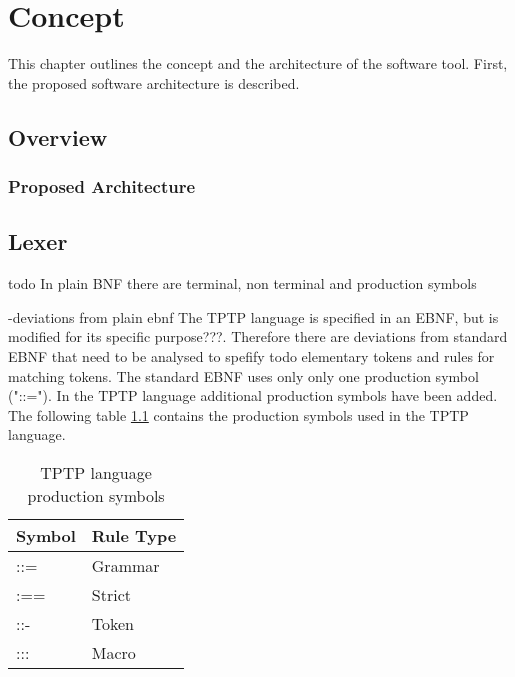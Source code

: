 
\chapter{Concept}\label{cha:Concept}
This chapter outlines the concept and the architecture of the software tool. First, the proposed software architecture is described.



\section{Overview}\label{sec:ConceptOverview}

\subsection{Proposed Architecture}\label{sec:ConceptProposedArchitecture}

\section{Lexer}

todo In plain \ac{BNF} there are terminal, non terminal and production symbols

-deviations from plain ebnf
The \ac{TPTP} language is specified in an \ac{EBNF}, but is modified for its specific purpose???.
Therefore there are deviations from standard \ac{EBNF} that need to be analysed to spefify todo elementary tokens and rules for matching tokens.
The standard \ac{EBNF} uses only only one production symbol ("::="). In the \ac{TPTP} language
additional production symbols have been added. The following table \ref{tbl:ConceptTPTPProductionSymbols} contains the production symbols used in the \ac{TPTP} language.

\begin{table}[H]
\centering
\renewcommand{\arraystretch}{1}
\caption{\ac{TPTP} language production symbols \cite{VS06}}
\begin{tabular}{ll}
\textbf{Symbol} & \textbf{Rule Type}\\\hline
::= & Grammar\\
:== & Strict\\
::- & Token\\
::: & Macro\\
\end{tabular}
\label{tbl:ConceptTPTPProductionSymbols}
\end{table}




